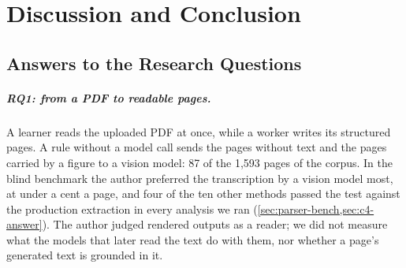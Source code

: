 \chapter{Discussion and Conclusion}
\label{ch:conclusion}

\section{Answers to the Research Questions}
\label{sec:summary}

\paragraph{RQ1: from a PDF to readable pages.}
A learner reads the uploaded PDF at once, while a worker writes its
structured pages. A rule without a model call sends the pages without text
and the pages carried by a figure to a vision model: 87 of the 1{,}593 pages
of the corpus. In the blind benchmark the author preferred the transcription
by a vision model most, at under a cent a page, and four of the ten
other methods passed the test against the production extraction in every analysis we ran
(\cref{sec:parser-bench,sec:c4-answer}). The author judged rendered outputs as a reader; we did not
measure what the models that later read the text do with them, nor whether
a page's generated text is grounded in it.

